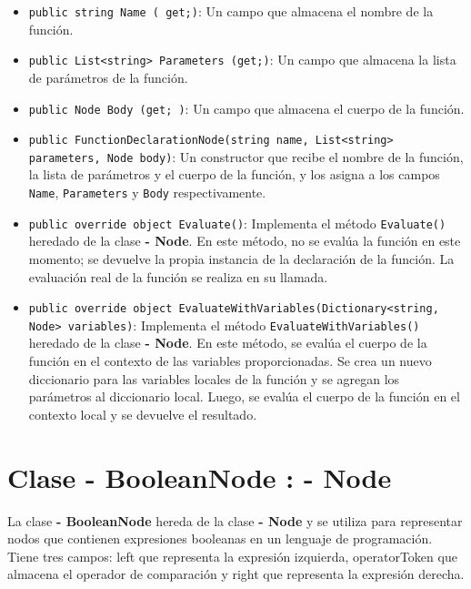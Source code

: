 \documentclass{article}
\newcommand{\subclassed}[1]{\textcolor{classcolor}{\textbf{- #1}}}
\begin{document}
\begin{itemize}
    \item \lstinline{public string Name ( get;)}: Un campo que almacena el nombre de la función.

    \item \lstinline{public List<string> Parameters (get;)}: Un campo que almacena la lista de parámetros de la función.

    \item \lstinline{public Node Body (get; )}: Un campo que almacena el cuerpo de la función.

    \item \lstinline{public FunctionDeclarationNode(string name, List<string> parameters, Node body)}: Un constructor que recibe el nombre de la función, la lista de parámetros y el cuerpo de la función, y los asigna a los campos \lstinline{Name}, \lstinline{Parameters} y \lstinline{Body} respectivamente.

    \item \lstinline{public override object Evaluate()}: Implementa el método \lstinline{Evaluate()} heredado de la clase \subclassed{Node}. En este método, no se evalúa la función en este momento; se devuelve la propia instancia de la declaración de la función. La evaluación real de la función se realiza en su llamada.

    \item \lstinline{public override object EvaluateWithVariables(Dictionary<string, Node> variables)}: Implementa el método \lstinline{EvaluateWithVariables()} heredado de la clase \subclassed{Node}. En este método, se evalúa el cuerpo de la función en el contexto de las variables proporcionadas. Se crea un nuevo diccionario para las variables locales de la función y se agregan los parámetros al diccionario local. Luego, se evalúa el cuerpo de la función en el contexto local y se devuelve el resultado.
\end{itemize}
\section{Clase \subclassed{BooleanNode} : \subclassed{Node}}

La clase \subclassed{BooleanNode} hereda de la clase \subclassed{Node} y se utiliza para representar nodos que contienen expresiones booleanas en un lenguaje de programación. Tiene tres campos: \textcolor{fieldcolor}{left} que representa la expresión izquierda, \textcolor{fieldcolor}{operatorToken} que almacena el operador de comparación y \textcolor{fieldcolor}{right} que representa la expresión derecha.
\end{document}
